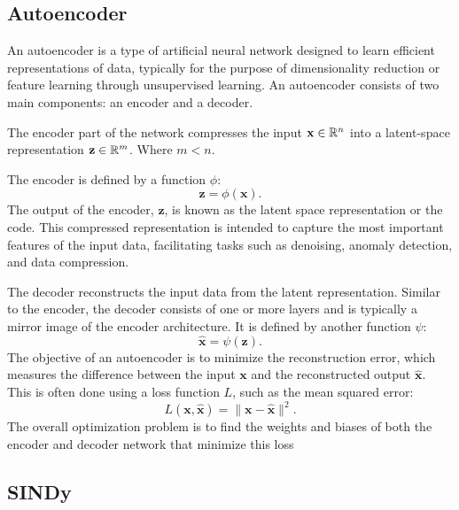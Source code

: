 
\subsection{Autoencoder}
An autoencoder \cite{hinton2006reducing} is a type of artificial neural network designed to learn efficient representations of data, typically for the purpose of dimensionality reduction or feature learning through unsupervised learning. An autoencoder consists of two main components: an encoder and a decoder.

The encoder part of the network compresses the input 
$\mathbf{x} \in \mathbb{R}^n$ into a latent-space representation $\mathbf{z} \in \mathbb{R}^m$. Where $m < n$.

The encoder is defined by a function $\phi$:
\begin{equation}
    \mathbf{z}=\phi(\mathbf{x}).
    \label{eq:encoder}
\end{equation}
The output of the encoder, $\mathbf z$, is known as the latent space representation or the code. This compressed representation is intended to capture the most important features of the input data, facilitating tasks such as denoising, anomaly detection, and data compression.

The decoder reconstructs the input data from the latent representation. Similar to the encoder, the decoder consists of one or more layers and is typically a mirror image of the encoder architecture. It is defined by another function $\psi$:
\begin{equation}
\hat{\mathbf{x}}=\psi(\mathbf{z}).
\label{eq:decoder}
\end{equation}
The objective of an autoencoder is to minimize the reconstruction error, which measures the difference between the input $\mathbf{x}$ and the reconstructed output $\hat{\mathbf{x}}$. This is often done using a loss function $L$, such as the mean squared error:
\begin{equation}
L(\mathbf{x}, \hat{\mathbf{x}})=\|\mathbf{x}-\hat{\mathbf{x}}\|^2.     
\end{equation}
The overall optimization problem is to find the weights and biases of both the encoder and decoder network that minimize this loss

\subsection{SINDy}

